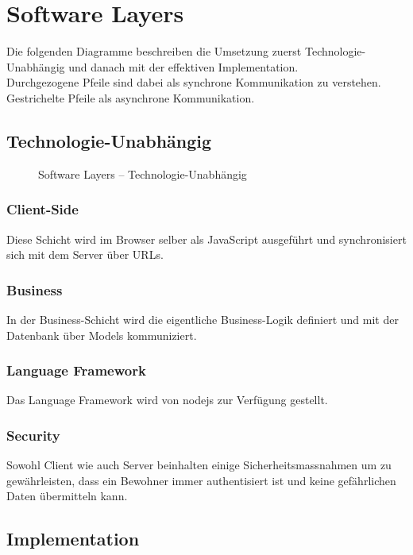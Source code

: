 \section{Software Layers}

Die folgenden Diagramme beschreiben die Umsetzung zuerst Technologie-Unabhängig und danach mit der effektiven Implementation.\\
Durchgezogene Pfeile sind dabei als synchrone Kommunikation zu verstehen. Gestrichelte Pfeile als asynchrone Kommunikation.

\subsection*{Technologie-Unabhängig}

\begin{figure}[ht!]
	\centering{
		
	}

	\caption{Software Layers -- Technologie-Unabhängig}
\end{figure}

\subsubsection*{Client-Side}
Diese Schicht wird im Browser selber als JavaScript ausgeführt und synchronisiert sich mit dem Server über URLs.

\subsubsection*{Business}
In der Business-Schicht wird die eigentliche Business-Logik definiert und mit der Datenbank über Models kommuniziert.

\subsubsection*{Language Framework}
Das Language Framework wird von \gls{nodejs} zur Verfügung gestellt.

\subsubsection*{Security}
Sowohl Client wie auch Server beinhalten einige Sicherheitsmassnahmen um zu gewährleisten, dass ein \gls{Bewohner} immer authentisiert ist und keine gefährlichen Daten übermitteln kann.

\newpage
\subsection*{Implementation}

